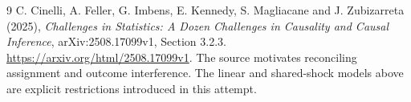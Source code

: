 \documentclass[11pt,a4paper]{article}
\theoremstyle{remark}
\begin{document}
\begin{thebibliography}{9}
 C. Cinelli, A. Feller, G. Imbens, E. Kennedy, S. Magliacane and J. Zubizarreta (2025), \emph{Challenges in Statistics: A Dozen Challenges in Causality and Causal Inference}, arXiv:2508.17099v1, Section 3.2.3. \url{https://arxiv.org/html/2508.17099v1}. The source motivates reconciling assignment and outcome interference. The linear and shared-shock models above are explicit restrictions introduced in this attempt.
\end{thebibliography}
\end{document}

